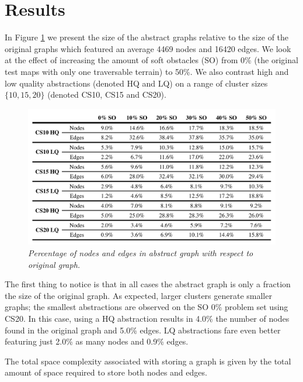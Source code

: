 \section{Results}
In Figure \ref{aha-fig:graphsize} we present the size of the abstract graphs relative to the size of the original graphs which featured an average 4469 nodes and 16420 edges. 
We look at the effect of increasing the amount of soft obstacles (SO) from 0\% (the original test maps with only one traversable terrain) to 50\%.
We also contrast high and low quality abstractions (denoted HQ and LQ) on a range of cluster sizes $\lbrace 10, 15, 20 \rbrace$ (denoted CS10, CS15 and CS20).
\begin{figure}[htbp]
	\vspace{-12pt}
       \caption{\small{\emph{Percentage of nodes and edges in abstract graph with respect to original graph. }}}
       \begin{center}
                       \includegraphics[scale=0.35, trim = 20mm 14mm 20mm 5mm]{diagrams/graphsize.pdf}
       \end{center}
       \label{aha-fig:graphsize}
	\vspace{-4pt}
\end{figure}
\par \indent
The first thing to notice is that in all cases the abstract graph is only a fraction the size of the original graph.
As expected, larger clusters generate smaller graphs; the smallest abstractions are observed on the SO 0\% problem set using CS20. 
In this case, using a HQ abstraction results in 4.0\% the number of nodes found in the original graph and 5.0\% edges. 
LQ abstractions fare even better featuring just 2.0\% as many nodes and 0.9\% edges.
\par \indent
The total space complexity associated with storing a graph is given by the total amount of space required to store both nodes and edges.
